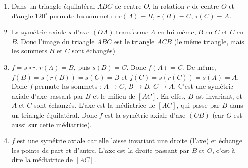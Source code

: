 \begin{enumerate}[label=\arabic*)]
    \item Dans un triangle équilatéral \(ABC\) de centre \(O\), la rotation \(r\) de centre \(O\) et d'angle \(120^\circ\) permute les sommets : \(r(A) = B\), \(r(B) = C\), \(r(C) = A\).
    \item La symétrie axiale \(s\) d'axe \((OA)\) transforme \(A\) en lui-même, \(B\) en \(C\) et \(C\) en \(B\). Donc l'image du triangle \(ABC\) est le triangle \(ACB\) (le même triangle, mais les sommets \(B\) et \(C\) sont échangés).
    \item \(f = s \circ r\). \(r(A) = B\), puis \(s(B) = C\). Donc \(f(A) = C\). De même, \(f(B) = s(r(B)) = s(C) = B\) et \(f(C) = s(r(C)) = s(A) = A\). Donc \(f\) permute les sommets : \(A \to C\), \(B \to B\), \(C \to A\). C'est une symétrie axiale d'axe passant par \(B\) et le milieu de \([AC]\). En effet, \(B\) est invariant, et \(A\) et \(C\) sont échangés. L'axe est la médiatrice de \([AC]\), qui passe par \(B\) dans un triangle équilatéral. Donc \(f\) est la symétrie axiale d'axe \((OB)\) (car \(O\) est aussi sur cette médiatrice).
    \item \(f\) est une symétrie axiale car elle laisse invariant une droite (l'axe) et échange les points de part et d'autre. L'axe est la droite passant par \(B\) et \(O\), c'est-à-dire la médiatrice de \([AC]\).
\end{enumerate}